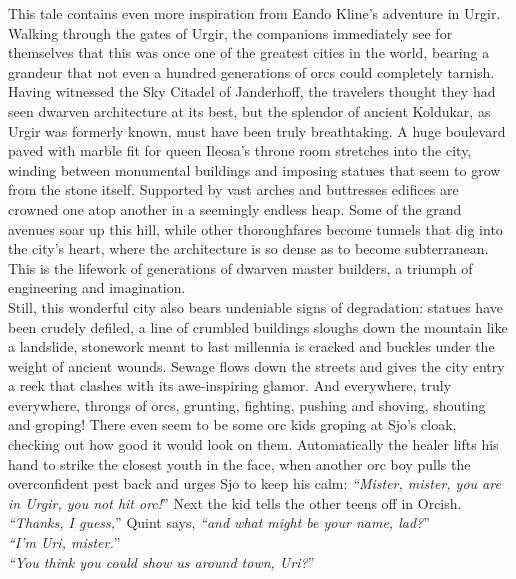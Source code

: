 This tale contains even more inspiration from Eando Kline's adventure in Urgir. Walking through the gates of Urgir, the companions immediately see for themselves that this was once one of the greatest cities in the world, bearing a grandeur that not even a hundred generations of orcs could completely tarnish. Having witnessed the Sky Citadel of Janderhoff, the travelers thought they had seen dwarven architecture at its best, but the splendor of ancient Koldukar, as Urgir was formerly known, must have been truly breathtaking. A huge boulevard paved with marble fit for queen Ileosa's throne room stretches into the city, winding between monumental buildings and imposing statues that seem to grow from the stone itself. Supported by vast arches and buttresses edifices are crowned one atop another in a seemingly endless heap. Some of the grand avenues soar up this hill, while other thoroughfares become tunnels that dig into the city's heart, where the architecture is so dense as to become subterranean. This is the lifework of generations of dwarven master builders, a triumph of engineering and imagination.\\

Still, this wonderful city also bears undeniable signs of degradation: statues have been crudely defiled, a line of crumbled buildings sloughs down the mountain like a landslide, stonework meant to last millennia is cracked and buckles under the weight of ancient wounds. Sewage flows down the streets and gives the city entry a reek that clashes with its awe-inspiring glamor. And everywhere, truly everywhere, throngs of orcs, grunting, fighting, pushing and shoving, shouting and groping! There even seem to be some orc kids groping at Sjo's cloak, checking out how good it would look on them. Automatically the healer lifts his hand to strike the closest youth in the face, when another orc boy pulls the overconfident pest back and urges Sjo to keep his calm: {\itshape``Mister, mister, you are in Urgir, you not hit orc!}'' Next the kid tells the other teens off in Orcish.\\

{\itshape``Thanks, I guess,}'' Quint says, {\itshape``and what might be your name, lad?}''\\

{\itshape``I'm Uri, mister.}''\\

{\itshape``You think you could show us around town, Uri?}''\\


